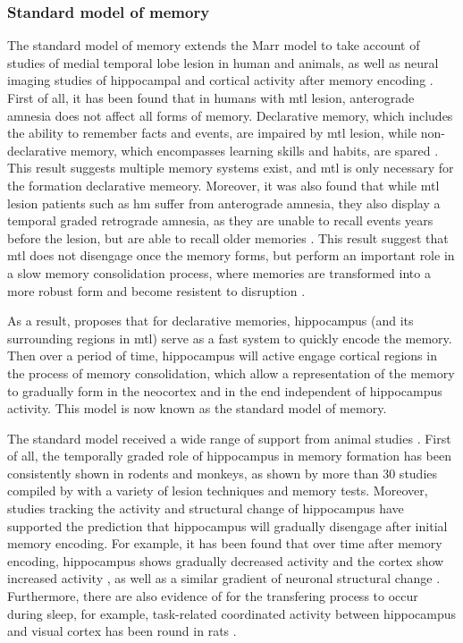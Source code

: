 \subsubsection{Standard model of memory \label{hpc-squire}}
The standard model of memory extends the Marr model to take account of studies of medial temporal lobe lesion in human and animals, as well as neural imaging studies of hippocampal and cortical activity after memory encoding \citep{squire92, squire09}. First of all, it has been found that in humans with \gls{mtl} lesion, anterograde amnesia does not affect all forms of memory. Declarative memory, which includes the ability to remember facts and events, are impaired by \gls{mtl} lesion, while non-declarative memory, which encompasses learning skills and habits, are spared \citep{cohen80, squire04}. This result suggests multiple memory systems exist, and \gls{mtl} is only necessary for the formation declarative memeory. Moreover, it was also found that while \gls{mtl} lesion patients such as \gls{hm} suffer from anterograde amnesia, they also display a temporal graded retrograde amnesia, as they are unable to recall events years before the lesion, but are able to recall older memories \citep{marslen-wilson75}. This result suggest that \gls{mtl} does not disengage once the memory forms, but perform an important role in a slow memory consolidation process, where memories are transformed into a more robust form and become resistent to disruption \citep{squire92}. 

As a result, \citet{squire92} proposes that for declarative memories, hippocampus (and its surrounding regions in \gls{mtl}) serve as a fast system to quickly encode the memory. Then over a period of time, hippocampus will active engage cortical regions in the process of memory consolidation, which allow a representation of the memory to gradually form in the neocortex and in the end independent of hippocampus activity. This model is now known as the standard model of memory. 

The standard model received a wide range of support from animal studies \citep{squire09}. First of all, the temporally graded role of hippocampus in memory formation has been consistently shown in rodents and monkeys, as shown by more than 30 studies compiled by \citet{frankland05} with a variety of lesion techniques and memory tests. Moreover, studies tracking the activity and structural change of hippocampus have supported the prediction that hippocampus will gradually disengage after initial memory encoding. For example, it has been found that over time after memory encoding, hippocampus shows gradually decreased activity and the cortex show increased activity \citep[e.g.][]{bontempi99, frankland04a, takehara-nishiuchi06}, as well as a similar gradient of neuronal structural change \citep[e.g.][]{routtenberg00, maviel04, restivo09}. Furthermore, there are also evidence of for the transfering process to occur during sleep, for example, task-related coordinated activity between hippocampus and visual cortex has been round in rats \citep{ji07}. 

